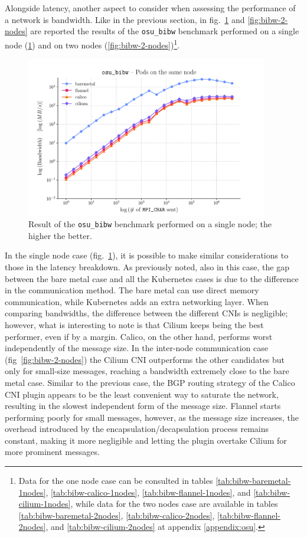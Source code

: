 Alongside latency, another aspect to consider when assessing the performance of
a network is bandwidth. Like in the previous section, in
fig.~\ref{fig:bibw-1-node} and \ref{fig:bibw-2-nodes} are reported the results
of the \texttt{osu\_bibw} benchmark performed on a single node
(\ref{fig:bibw-1-node}) and on two nodes (\ref{fig:bibw-2-nodes})\footnote{
  Data for the one node case can be consulted in tables
  \ref{tab:bibw-baremetal-1nodes}, \ref{tab:bibw-calico-1nodes},
  \ref{tab:bibw-flannel-1nodes}, and \ref{tab:bibw-cilium-1nodes}, while data
  for the two nodes case are available in tables
  \ref{tab:bibw-baremetal-2nodes}, \ref{tab:bibw-calico-2nodes},
  \ref{tab:bibw-flannel-2nodes}, and \ref{tab:bibw-cilium-2nodes} at appendix
  \ref{appendix:osu}.}.

\begin{figure}
  \centering
  \includegraphics[width=0.94\textwidth]{img/chpt3/bibw-1-node}
  \caption{Result of the \texttt{osu\_bibw} benchmark performed on a single
    node; the higher the better.}
  \label{fig:bibw-1-node}
\end{figure}

In the single node case (fig.~\ref{fig:bibw-1-node}), it is possible to make
similar considerations to those in the latency breakdown.
As previously noted, also in this case, the gap between the bare metal case and
all the Kubernetes cases is due to the difference in the communication method.
The bare metal can use direct memory communication, while Kubernetes adds an
extra networking layer.
When comparing bandwidths, the difference between the different CNIs is
negligible; however, what is interesting to note is that Cilium keeps being the
best performer, even if by a margin.
Calico, on the other hand, performs worst independently of the message size.
In the inter-node communication case (fig~\ref{fig:bibw-2-nodes}) the Cilium CNI
outperforms the other candidates but only for small-size messages, reaching a
bandwidth extremely close to the bare metal case.
Similar to the previous case, the BGP routing strategy of the Calico CNI plugin
appears to be the least convenient way to saturate the network, resulting in the
slowest independent form of the message size.
Flannel starts performing poorly for small messages, however, as the message
size increases, the overhead introduced by the encapsulation/decapsulation
process remains constant, making it more negligible and letting the plugin
overtake Cilium for more prominent messages.

